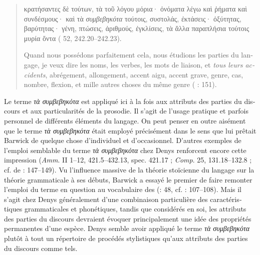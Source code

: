 \documentclass[output=paper]{langsci/langscibook}
\begin{document}
\begin{otherlanguage}{french}
\begin{quote}
    κρατήσαντες δὲ τούτων, τὰ τοῦ λόγου μόρια· ὀνόματα λέγω καὶ ῥήματα καὶ συνδέσμους· καὶ τὰ \textit{συμβεβηκότα} τούτοις, συστολάς, ἐκτάσεις· ὀξύτητας, βαρύτητας· γένη, πτώσεις, ἀριθμούς, ἐγκλίσεις, τὰ ἄλλα παραπλήσια τούτοις μυρία ὄντα ( 52, 242.20--242.23).
    
    Quand nous possédons parfaitement cela, nous étudions les parties du langage, je veux dire les noms, les verbes, les mots de liaison, et \textit{tous leurs accidents}, abrégement, allongement, accent aigu, accent grave, genre, cas, nombre, flexion, et mille autres choses du même genre (\citealt{aujac_denys_1988} : 151).
\end{quote}

Le terme \textit{τὰ συμβεβηκότα} est appliqué ici à la fois aux attributs des parties du discours et aux particularités de la prosodie. Il s’agit de l’usage pratique et parfois personnel de différents éléments du langage. On peut penser en outre aisément que le terme \textit{τὰ συμβεβηκότα} était employé précisément dans le sens que lui prêtait Barwick de quelque chose d’individuel et d’occasionnel. D’autres exemples de l’emploi semblable du terme \textit{τὰ συμβεβηκότα} chez Denys renforcent encore cette impression (\textit{Amm}. II 1–12, 421.5–432.13, spec. 421.17 ; \textit{Comp}. 25, 131.18–132.8 ; cf. de \citealt{jonge_between_2008}: 147–149). Vu l’influence massive de la théorie stoïcienne du langage sur la théorie grammaticale à ses débuts, Barwick a essayé le premier de faire remonter l’emploi du terme en question au vocabulaire des  (\citealt{barwick_probleme_1957}: 48, cf. \citealt{barwick_remmius_1922}: 107–108). Mais il s’agit chez Denys généralement d’une combinaison particulière des caractéristiques grammaticales et phonétiques, tandis que considérés en soi, les attributs des parties du discours devraient évoquer principalement une idée des propriétés permanentes d’une espèce. Denys semble avoir appliqué le terme \textit{τὰ συμβεβηκότα} plutôt à tout un répertoire de procédés stylistiques qu’aux attributs des parties du discours comme tels. 


\end{otherlanguage}
\end{document}
